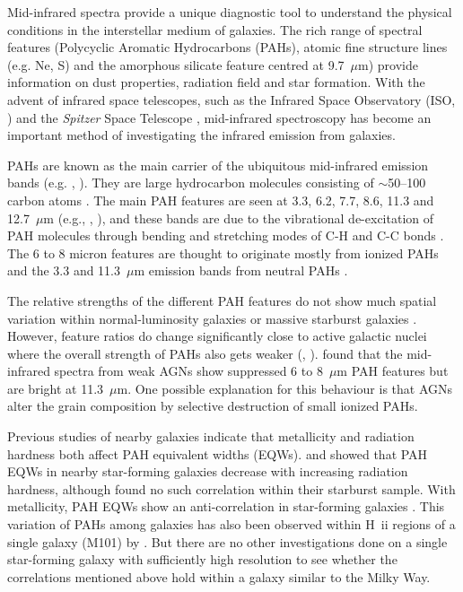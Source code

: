 Mid-infrared spectra provide a unique diagnostic tool to understand the physical conditions in the interstellar medium of galaxies. 
The rich range of spectral features (Polycyclic Aromatic Hydrocarbons (PAHs), atomic fine structure lines (e.g. Ne, S) and the
amorphous silicate feature centred at 9.7~$\mu$m) provide information on dust properties, radiation field and star formation. 
With the advent of infrared space telescopes, such as the Infrared Space Observatory (ISO, \citealt{Kessler1996}) and 
the {\em Spitzer} Space Telescope \citep{spitzer2004},  mid-infrared spectroscopy has become an important method
of investigating the infrared emission from galaxies. 

PAHs are known as the main carrier of the ubiquitous mid-infrared emission bands (e.g. \citealt{Allamandola1989}, \citealt{puget89}).
They are large hydrocarbon molecules consisting of $\sim$50--100 carbon atoms \citep{Tielens2008}. 
The main PAH features are seen at 3.3, 6.2, 7.7, 8.6, 11.3 and 12.7~$\mu $m (e.g., \citealt{Mattila1996}, \citealt{Peeters2002}), 
and these bands are due to the vibrational de-excitation of PAH molecules  through bending and stretching modes of C-H and C-C bonds \citep{Tielens:2005lr}. 
The 6 to 8 micron features are thought to originate mostly from ionized PAHs and the 3.3 and 11.3~$\mu$m 
emission bands from neutral PAHs \citep{Peeters2002}. 


The relative strengths of the different PAH features do not show much spatial variation within normal-luminosity galaxies \citep{Smith:2007lr} or 
massive starburst galaxies \citep{Brandl2006}. However, feature ratios do change significantly close to active galactic nuclei where the overall
strength of PAHs also gets weaker (\citealt{Roche1991}, \citealt{Smith:2007lr}). \citet{Smith:2007lr}  found that the mid-infrared 
spectra from weak AGNs show suppressed 6 to 8~$\mu$m PAH features but are bright at 11.3~$\mu$m. 
One possible explanation for this behaviour is that AGNs alter the grain composition by selective destruction of small ionized PAHs. 

 
Previous studies of nearby galaxies indicate that metallicity and radiation hardness both affect PAH equivalent widths (EQWs). 
\citet{Smith:2007lr} and \citet{Engelbracht_2008} showed that PAH EQWs in nearby star-forming galaxies  decrease with increasing radiation hardness,
although  \citet{Brandl2006} found no such correlation within their starburst sample.  With metallicity, PAH EQWs show an anti-correlation 
in star-forming galaxies \citep{Marble_2010}. This variation of PAHs among galaxies has also been observed within H~{\sc ii} regions 
of a single galaxy (M101) by \citet{Gordon:2008lr}. But there are no other investigations done on a single star-forming galaxy with 
sufficiently high resolution to see whether the correlations mentioned above hold within a galaxy similar to the Milky Way.

